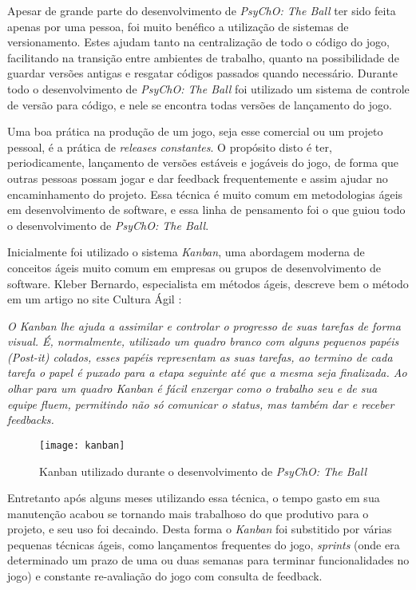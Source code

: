 Apesar de grande parte do desenvolvimento de \textit{PsyChO: The Ball} ter sido feita apenas por uma pessoa, foi muito benéfico a utilização de sistemas de versionamento. Estes ajudam tanto na centralização de todo o código do jogo, facilitando na transição entre ambientes de trabalho, quanto na possibilidade de guardar versões antigas e resgatar códigos passados quando necessário. Durante todo o desenvolvimento de \textit{PsyChO: The Ball} foi utilizado um sistema de controle de versão para código, e nele se encontra todas versões de lançamento do jogo.

Uma boa prática na produção de um jogo, seja esse comercial ou um projeto pessoal, é a prática de \textit{releases constantes}. O propósito disto é ter, periodicamente, lançamento de versões estáveis e jogáveis do jogo, de forma que outras pessoas possam jogar e dar feedback frequentemente e assim ajudar no encaminhamento do projeto. Essa técnica é muito comum em metodologias ágeis em desenvolvimento de software, e essa linha de pensamento foi o que guiou todo o desenvolvimento de \textit{PsyChO: The Ball}.

Inicialmente foi utilizado o sistema \textit{Kanban}, uma abordagem moderna de conceitos ágeis muito comum em empresas ou grupos de desenvolvimento de software. Kleber Bernardo, especialista em métodos ágeis, descreve bem o método em um artigo no site Cultura Ágil \cite{kleberkanban}:

\begin{displayquote}
  \textit{O Kanban lhe ajuda a assimilar e controlar o progresso de suas tarefas de forma visual. É, normalmente, utilizado um quadro branco com alguns pequenos papéis (Post-it) colados, esses papéis representam as suas tarefas, ao termino de cada tarefa o papel é puxado para a etapa seguinte até que a mesma seja finalizada. Ao olhar para um quadro Kanban é fácil enxergar como o trabalho seu e de sua equipe fluem, permitindo não só comunicar o status, mas também dar e receber feedbacks.}
\end{displayquote}

\begin{figure}[h!]
\texttt{[image: kanban]}
\centering
\caption{Kanban utilizado durante o desenvolvimento de \textit{PsyChO: The Ball}}
\end{figure}

Entretanto após alguns meses utilizando essa técnica, o tempo gasto em sua manutenção acabou se tornando mais trabalhoso do que produtivo para o projeto, e seu uso foi decaindo. Desta forma o \textit{Kanban} foi substitido por várias pequenas técnicas ágeis, como lançamentos frequentes do jogo, \textit{sprints} (onde era determinado um prazo de uma ou duas semanas para terminar funcionalidades no jogo) e constante re-avaliação do jogo com consulta de feedback.

